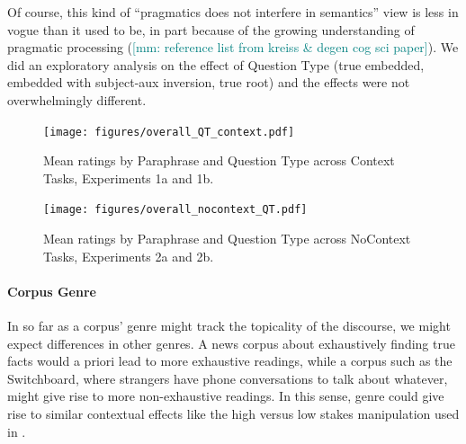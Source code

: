 \documentclass[12pt,letterpaper,table,svgnames,dvipsnames]{article}
\newcommand{\mm}[1]{\textcolor{teal}{[mm: #1]}}
\newcommand{\whq}{\emph{wh}-question~}
\begin{document}
Of course, this kind of ``pragmatics does not interfere in semantics'' view is less in vogue than it used to be, in part because of the growing understanding of pragmatic processing (\mm{reference list from kreiss \& degen cog sci paper}). We did an exploratory analysis on the effect of Question Type (true embedded, embedded with subject-aux inversion, true root) and the effects were not overwhelmingly different. 

\begin{figure}[h!]
\centering
\texttt{[image: figures/overall\_QT\_context.pdf]}
\caption{Mean ratings by Paraphrase and Question Type across Context Tasks, Experiments 1a and 1b.} 
\label{exs1_QT}
\end{figure}


\begin{figure}[h!]
\centering
\texttt{[image: figures/overall\_nocontext\_QT.pdf]}
\caption{Mean ratings by Paraphrase and Question Type across NoContext Tasks, Experiments 2a and 2b.} 
\label{exs2_QT}
\end{figure}



\paragraph{Corpus Genre}
In so far as a corpus' genre might track the topicality of the discourse, we might expect differences in other genres. A news corpus about exhaustively finding true facts would a priori lead to more exhaustive readings, while a corpus such as the Switchboard, where strangers have phone conversations to talk about whatever, might give rise to more non-exhaustive readings. In this sense, genre could give rise to similar contextual effects like the high versus low stakes manipulation used in \cite{moyersyrett2019}.


\end{document}
